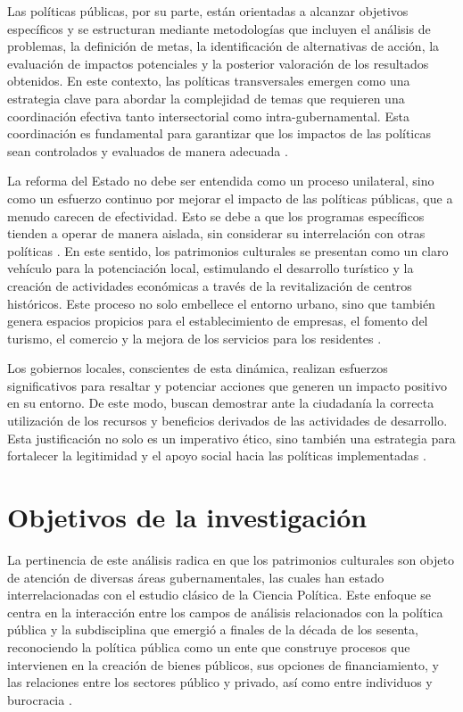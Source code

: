 \documentclass[
  spanish,
  11pt,
  a4paper,
]{scrbook}
\begin{document}
Las políticas públicas, por su parte, están orientadas a alcanzar
objetivos específicos y se estructuran mediante metodologías que
incluyen el análisis de problemas, la definición de metas, la
identificación de alternativas de acción, la evaluación de impactos
potenciales y la posterior valoración de los resultados obtenidos. En
este contexto, las políticas transversales emergen como una estrategia
clave para abordar la complejidad de temas que requieren una
coordinación efectiva tanto intersectorial como intra-gubernamental.
Esta coordinación es fundamental para garantizar que los impactos de las
políticas sean controlados y evaluados de manera adecuada
\autocite{Cantar2021}.

La reforma del Estado no debe ser entendida como un proceso unilateral,
sino como un esfuerzo continuo por mejorar el impacto de las políticas
públicas, que a menudo carecen de efectividad. Esto se debe a que los
programas específicos tienden a operar de manera aislada, sin considerar
su interrelación con otras políticas \autocite{MendezBahena2016}. En
este sentido, los patrimonios culturales se presentan como un claro
vehículo para la potenciación local, estimulando el desarrollo turístico
y la creación de actividades económicas a través de la revitalización de
centros históricos. Este proceso no solo embellece el entorno urbano,
sino que también genera espacios propicios para el establecimiento de
empresas, el fomento del turismo, el comercio y la mejora de los
servicios para los residentes \autocite{Fracasso2019}.

Los gobiernos locales, conscientes de esta dinámica, realizan esfuerzos
significativos para resaltar y potenciar acciones que generen un impacto
positivo en su entorno. De este modo, buscan demostrar ante la
ciudadanía la correcta utilización de los recursos y beneficios
derivados de las actividades de desarrollo. Esta justificación no solo
es un imperativo ético, sino también una estrategia para fortalecer la
legitimidad y el apoyo social hacia las políticas implementadas
\autocite{TorresMuseo2024}.

\section*{Objetivos de la
investigación}\label{objetivos-de-la-investigaciuxf3n}


La pertinencia de este análisis radica en que los patrimonios culturales
son objeto de atención de diversas áreas gubernamentales, las cuales han
estado interrelacionadas con el estudio clásico de la Ciencia Política.
Este enfoque se centra en la interacción entre los campos de análisis
relacionados con la política pública y la subdisciplina que emergió a
finales de la década de los sesenta, reconociendo la política pública
como un ente que construye procesos que intervienen en la creación de
bienes públicos, sus opciones de financiamiento, y las relaciones entre
los sectores público y privado, así como entre individuos y burocracia
\autocite{Fracasso2019,Hernandis2016}.
\end{document}

